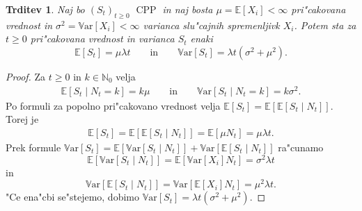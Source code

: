 \documentclass[12pt, a4paper, reqno]{amsart}
\theoremstyle{definition}
\theoremstyle{plain}
\newtheorem{trditev}[definicija]{Trditev}
\newcommand{\N}{\mathbb{N}}
\newcommand{\E}{\mathbb{E}}
\newcommand{\1}{\mathds{1}}
\newcommand{\Var}[1]{\text{$\mathbb{V}\!\mathrm{ar}$}\left[#1\right]}
\DeclareMathOperator{\CPP}{CPP}
\begin{document}
        \begin{trditev}
            Naj bo $(S_t)_{t\geq 0}$ $\CPP$ in naj bosta $\mu = \E\left[X_i\right] < \infty$ 
            pri"cakovana vrednost in $\sigma^2= \Var{X_i} <\infty$ varianca
            slu"cajnih spremenljivk $X_i$. Potem sta za $t\geq0$ pri"cakovana vrednost in 
            varianca $S_t$ enaki 
            \begin{equation*}
                \E\left[S_t\right] = \mu\lambda t \qquad \text{in} \qquad \Var{S_t} = \lambda t\left(\sigma^2 + \mu^2\right).
            \end{equation*}
            \label{trd:PricVarCPP}
        \end{trditev}

        \begin{proof}

            Za $t\geq0$ in $k\in \N_0$ velja 
            \begin{align*}
            \E\left[S_t\mid N_t = k\right]  = k\mu \qquad \text{in} \qquad
            \Var{S_t\mid N_t = k} = k\sigma^2.
            \end{align*} 
            Po formuli za popolno pri"cakovano vrednost velja 
            $\E\left[S_t\right] = \E\left[\E\left[S_t\mid N_t\right]\right]$. Torej je
            \begin{align*}
                \E\left[S_t\right] = \E\left[\E\left[S_t\mid N_t\right]\right] = \E\left[\mu N_t\right] = \mu\lambda t.
            \end{align*}
            Prek formule $\Var{S_t} = \E\left[\Var{S_t\mid N_t}\right] + \Var{\E\left[S_t\mid N_t\right]}$ ra"cunamo 
            \begin{equation*}
                \E\left[\Var{S_t\mid N_t}\right] = \E\left[\Var{X_i}N_t\right] = \sigma^2\lambda t
            \end{equation*}
            in 
            \begin{equation*}
                \Var{\E\left[S_t\mid N_t\right]} = \Var{\E\left[X_i\right]N_t} = \mu^2\lambda t.
            \end{equation*}
            "Ce ena"cbi se"stejemo, dobimo $\Var{S_t} = \lambda t\left(\sigma^2 + \mu^2\right)$.
        \end{proof}
    
\end{document}
